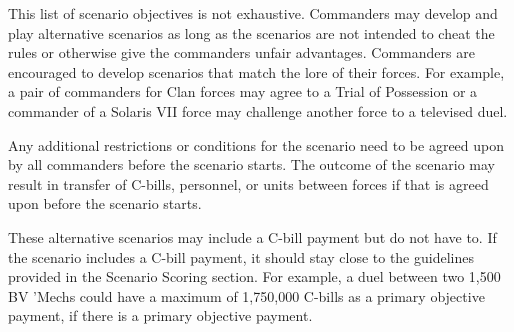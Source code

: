 This list of scenario objectives is not exhaustive.
Commanders may develop and play alternative scenarios as long as the scenarios are not intended to cheat the rules or otherwise give the commanders unfair advantages.
Commanders are encouraged to develop scenarios that match the lore of their forces.
For example, a pair of commanders for Clan forces may agree to a Trial of Possession or a commander of a Solaris VII force may challenge another force to a televised duel.

Any additional restrictions or conditions for the scenario need to be agreed upon by all commanders before the scenario starts.
The outcome of the scenario may result in transfer of C-bills, personnel, or units between forces if that is agreed upon before the scenario starts.

These alternative scenarios may include a C-bill payment but do not have to.
If the scenario includes a C-bill payment, it should stay close to the guidelines provided in the Scenario Scoring section.
For example, a duel between two 1,500 BV 'Mechs could have a maximum of 1,750,000 C-bills as a primary objective payment, if there is a primary objective payment.
